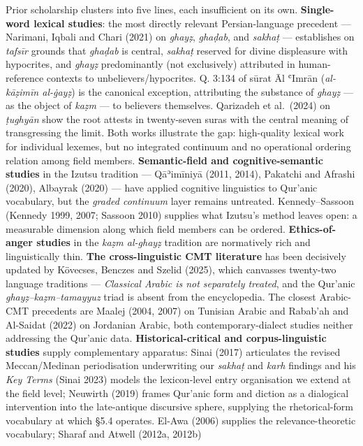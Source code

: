 Prior scholarship clusters into five lines, each insufficient on its
own. \textbf{Single-word lexical studies}: the most directly relevant
Persian-language precedent --- Narimani, Iqbali and Chari (2021) on
\emph{ghayẓ}, \emph{ghaḍab}, and \emph{sakhaṭ} --- establishes on
\emph{tafsīr} grounds that \emph{ghaḍab} is central, \emph{sakhaṭ}
reserved for divine displeasure with hypocrites, and \emph{ghayẓ}
predominantly (not exclusively) attributed in human-reference contexts
to unbelievers/hypocrites. Q. 3:134 of sūrat Āl ʿImrān (\emph{al-kāẓimīn
al-ġayẓ}) is the canonical exception, attributing the substance of
\emph{ghayẓ} --- as the object of \emph{kaẓm} --- to believers
themselves. Qarizadeh et al.~(2024) on \emph{ṭughyān} show the root
attests in twenty-seven suras with the central meaning of transgressing
the limit. Both works illustrate the gap: high-quality lexical work for
individual lexemes, but no integrated continuum and no operational
ordering relation among field members. \textbf{Semantic-field and
cognitive-semantic studies} in the Izutsu tradition --- Qāʾimīniyā
(2011, 2014), Pakatchi and Afrashi (2020), Albayrak (2020) --- have
applied cognitive linguistics to Qur'anic vocabulary, but the
\emph{graded continuum} layer remains untreated. Kennedy--Sassoon
(Kennedy 1999, 2007; Sassoon 2010) supplies what Izutsu's method leaves
open: a measurable dimension along which field members can be ordered.
\textbf{Ethics-of-anger studies} in the \emph{kaẓm al-ghayẓ} tradition
are normatively rich and linguistically thin. \textbf{The
cross-linguistic CMT literature} has been decisively updated by
Kövecses, Benczes and Szelid (2025), which canvasses twenty-two language
traditions --- \emph{Classical Arabic is not separately treated}, and
the Qur'anic \emph{ghayẓ--kaẓm--tamayyuz} triad is absent from the
encyclopedia. The closest Arabic-CMT precedents are Maalej (2004, 2007)
on Tunisian Arabic and Rabab'ah and Al-Saidat (2022) on Jordanian
Arabic, both contemporary-dialect studies neither addressing the
Qur'anic data. \textbf{Historical-critical and corpus-linguistic
studies} supply complementary apparatus: Sinai (2017) articulates the
revised Meccan/Medinan periodisation underwriting our \emph{sakhaṭ} and
\emph{karh} findings and his \emph{Key Terms} (Sinai 2023) models the
lexicon-level entry organisation we extend at the field level; Neuwirth
(2019) frames Qur'anic form and diction as a dialogical intervention
into the late-antique discursive sphere, supplying the rhetorical-form
vocabulary at which §5.4 operates. El-Awa (2006) supplies the
relevance-theoretic vocabulary; Sharaf and Atwell (2012a, 2012b)
